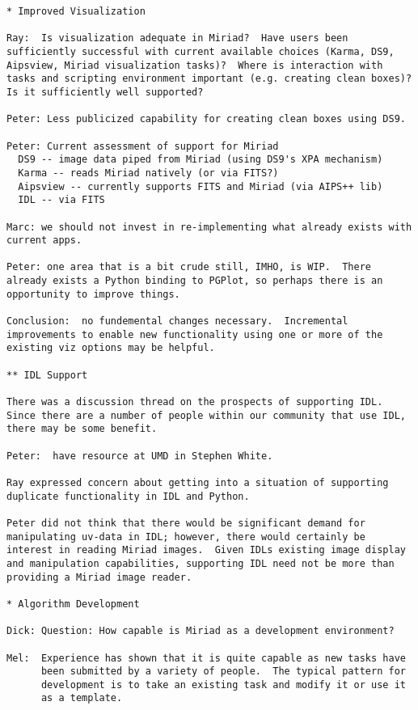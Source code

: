 \begin{verbatim}
* Improved Visualization

Ray:  Is visualization adequate in Miriad?  Have users been
sufficiently successful with current available choices (Karma, DS9,
Aipsview, Miriad visualization tasks)?  Where is interaction with
tasks and scripting environment important (e.g. creating clean boxes)?
Is it sufficiently well supported?

Peter: Less publicized capability for creating clean boxes using DS9.  

Peter: Current assessment of support for Miriad 
  DS9 -- image data piped from Miriad (using DS9's XPA mechanism)
  Karma -- reads Miriad natively (or via FITS?)
  Aipsview -- currently supports FITS and Miriad (via AIPS++ lib)
  IDL -- via FITS

Marc: we should not invest in re-implementing what already exists with
current apps.  

Peter: one area that is a bit crude still, IMHO, is WIP.  There
already exists a Python binding to PGPlot, so perhaps there is an
opportunity to improve things.  

Conclusion:  no fundemental changes necessary.  Incremental
improvements to enable new functionality using one or more of the
existing viz options may be helpful.

** IDL Support

There was a discussion thread on the prospects of supporting IDL.
Since there are a number of people within our community that use IDL,
there may be some benefit.  

Peter:  have resource at UMD in Stephen White.

Ray expressed concern about getting into a situation of supporting
duplicate functionality in IDL and Python.  

Peter did not think that there would be significant demand for
manipulating uv-data in IDL; however, there would certainly be
interest in reading Miriad images.  Given IDLs existing image display
and manipulation capabilities, supporting IDL need not be more than
providing a Miriad image reader.

* Algorithm Development

Dick: Question: How capable is Miriad as a development environment?  

Mel:  Experience has shown that it is quite capable as new tasks have
      been submitted by a variety of people.  The typical pattern for
      development is to take an existing task and modify it or use it
      as a template.  


\end{verbatim}
